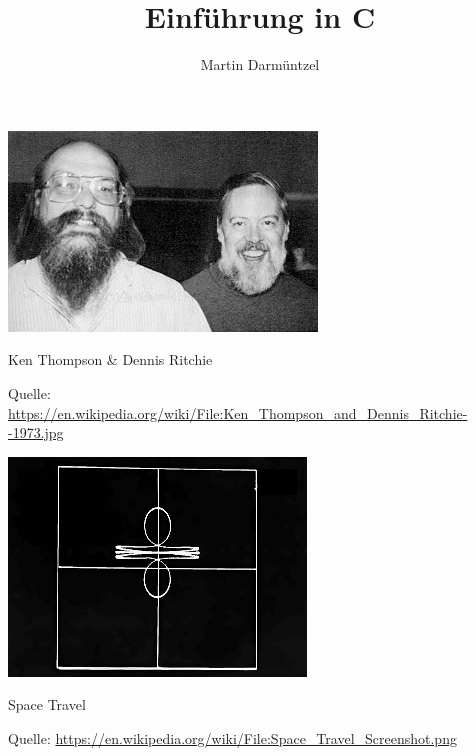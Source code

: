 \documentclass[
  aspectratio=1610,
]{beamer}
\author{Martin Darmüntzel}
\title{Einführung in C}
\institute{Universität Rostock}
\begin{document}
\begin{frame}
  \titlepage{}
\end{frame}


\begin{frame}
  \begin{center}
    \includegraphics{Ken_Thompson_and_Dennis_Ritchie--1973.jpg}

    Ken Thompson \& Dennis Ritchie
  \end{center}
  \tiny Quelle:
  \url{https://en.wikipedia.org/wiki/File:Ken_Thompson_and_Dennis_Ritchie--1973.jpg}
\end{frame}

\begin{frame}
  \begin{center}
    \includegraphics{Space_Travel_Screenshot.png}

    Space Travel
  \end{center}
  \tiny Quelle:
  \url{https://en.wikipedia.org/wiki/File:Space_Travel_Screenshot.png}
\end{frame}
\end{document}
